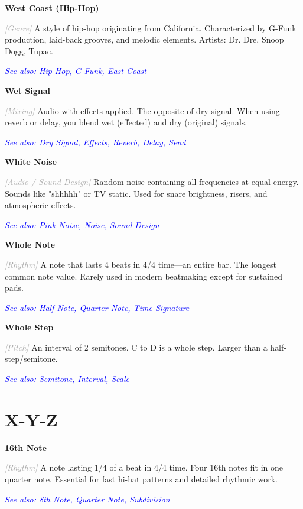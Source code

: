 \documentclass[11pt,letterpaper]{article}
\newcommand{\term}[1]{\textbf{\large\color{purple}#1}}
\newcommand{\category}[1]{\textcolor{darkgray}{\textit{\small [#1]}}}
\newcommand{\seealso}[1]{\textcolor{blue}{\textit{See also: #1}}}
\newenvironment{termdef}[1]
  {\noindent\term{#1}\par\nopagebreak}
  {\par\vspace{0.3em}}
\begin{document}
\begin{termdef}{West Coast (Hip-Hop)}
\category{Genre}
A style of hip-hop originating from California. Characterized by G-Funk production, laid-back grooves, and melodic elements. Artists: Dr. Dre, Snoop Dogg, Tupac.

\seealso{Hip-Hop, G-Funk, East Coast}
\end{termdef}

\begin{termdef}{Wet Signal}
\category{Mixing}
Audio with effects applied. The opposite of dry signal. When using reverb or delay, you blend wet (effected) and dry (original) signals.

\seealso{Dry Signal, Effects, Reverb, Delay, Send}
\end{termdef}

\begin{termdef}{White Noise}
\category{Audio / Sound Design}
Random noise containing all frequencies at equal energy. Sounds like "shhhhh" or TV static. Used for snare brightness, risers, and atmospheric effects.

\seealso{Pink Noise, Noise, Sound Design}
\end{termdef}

\begin{termdef}{Whole Note}
\category{Rhythm}
A note that lasts 4 beats in 4/4 time—an entire bar. The longest common note value. Rarely used in modern beatmaking except for sustained pads.

\seealso{Half Note, Quarter Note, Time Signature}
\end{termdef}

\begin{termdef}{Whole Step}
\category{Pitch}
An interval of 2 semitones. C to D is a whole step. Larger than a half-step/semitone.

\seealso{Semitone, Interval, Scale}
\end{termdef}

\section*{X-Y-Z}

\begin{termdef}{16th Note}
\category{Rhythm}
A note lasting 1/4 of a beat in 4/4 time. Four 16th notes fit in one quarter note. Essential for fast hi-hat patterns and detailed rhythmic work.

\seealso{8th Note, Quarter Note, Subdivision}
\end{termdef}
\end{document}
